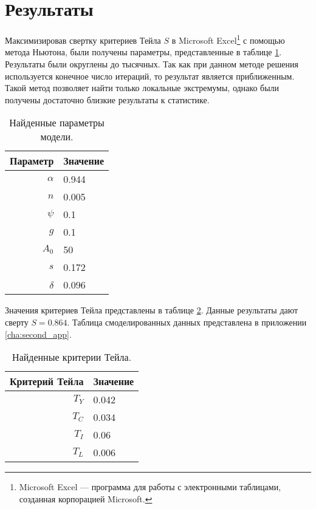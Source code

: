 \section{Результаты}

Максимизировав свертку критериев Тейла $S$ в Microsoft Excel\footnote{Microsoft Excel --- программа для работы с электронными таблицами, созданная корпорацией Microsoft.} с помощью метода Ньютона, были получены параметры, представленные в таблице \ref{tab::res_params}.
Результаты были округлены до тысячных.
Так как при данном методе решения используется конечное число итераций, то результат является приближенным.
Такой метод позволяет найти только локальные экстремумы, однако были получены достаточно близкие результаты к статистике.

\begin{table}[ht]
	\centering
	\caption{Найденные параметры модели.}
	\label{tab::res_params}
	\begin{tabular}{|r|l|}
	\hline
	Параметр & Значение         \\ \hline
	$\alpha$ &      0.944       \\
	$n$      &      0.005       \\
	$\psi$   &      0.1         \\
	$g$      &      0.1         \\
	$A_0$    &      50          \\
	$s$      &      0.172       \\
	$\delta$ &      0.096       \\ \hline
	\end{tabular}%
\end{table}

Значения критериев Тейла представлены в таблице \ref{tab::res_crit_teil}.
Данные результаты дают сверту $S=0.864$.
Таблица смоделированных данных представлена в приложении \ref{cha:second_app}.

\begin{table}[ht]
	\centering
	\caption{Найденные критерии Тейла.}
	\label{tab::res_crit_teil}
	\begin{tabular}{|r|l|}
	\hline
	Критерий Тейла & Значение         \\ \hline
	$T_{Y}$        &      0.042       \\
	$T_{C}$        &      0.034       \\
	$T_{I}$        &      0.06        \\
	$T_{L}$        &      0.006       \\ \hline
	\end{tabular}%
\end{table}

